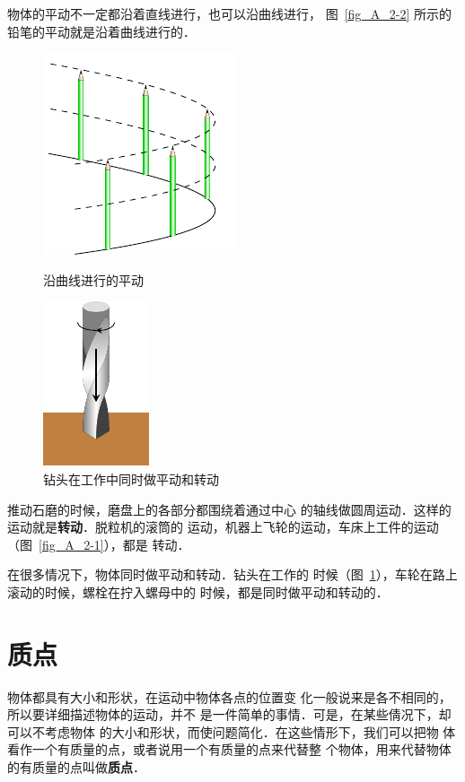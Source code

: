     物体的平动不一定都沿着直线进行，也可以沿曲线进行，
图~\ref{fig_A_2-2} 所示的铅笔的平动就是沿着曲线进行的．
\begin{figure}[htbp]
\centering
\begin{minipage}[t]{0.48\textwidth}
\centering
\includegraphics{fig/A/2-2.pdf}
\caption{沿曲线进行的平动}\label{fig_A_2-2}
\end{minipage}
\begin{minipage}[t]{0.48\textwidth}
\centering
\includegraphics{fig/A/2-3.pdf}
\caption{钻头在工作中同时做平动和转动}\label{fig_A_2-3}
\end{minipage}
\end{figure}
    
    推动石磨的时候，磨盘上的各部分都围绕着通过中心
的轴线做圆周运动．这样的运动就是\textbf{转动}．脱粒机的滚筒的
运动，机器上飞轮的运动，车床上工件的运动（图~\ref{fig_A_2-1}），都是
转动．


    在很多情况下，物体同时做平动和转动．钻头在工作的
时候（图~\ref{fig_A_2-3}），车轮在路上滚动的时候，螺栓在拧入螺母中的
时候，都是同时做平动和转动的．

\section{质点}
    物体都具有大小和形状，在运动中物体各点的位置变
化一般说来是各不相同的，所以要详细描述物体的运动，并不
是一件简单的事情．可是，在某些倩况下，却可以不考虑物体
的大小和形状，而使问题简化．在这些情形下，我们可以把物
体看作一个有质量的点，或者说用一个有质量的点来代替整
个物体，用来代替物体的有质量的点叫做\textbf{质点}．

